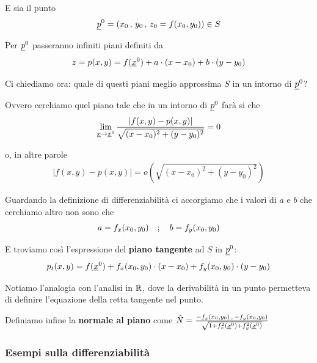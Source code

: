 E sia il punto
\begin{align}
\underline{p}^0 = (x_0 \, , \, y_0 \, , \, z_0=f(x_0,y_0)) \in S
\end{align}

Per $\underline{p}^0$ passeranno infiniti piani definiti da
\begin{align}
z=p(x,y)= f(\underline{x}^0) + a \cdot (x-x_0) + b \cdot (y-y_0)
\end{align}

Ci chiediamo ora: quale di questi piani meglio approssima $S$ in un intorno di $\underline{p}^0$? 

\smallskip

Ovvero cerchiamo quel piano tale che in un intorno di $\underline{p}^0$ farà si che
\begin{align}
\underset{\underline{x} \rightarrow \underline{x}^0}{\lim} \, \frac{|f(x,y) - p(x,y)|}{\sqrt{(x-x_0)^2 + (y-y_0)^2}}=0
\end{align}

o, in altre parole
\begin{align}
|f(x,y) - p(x,y)|= o(\sqrt{(x-x_0)^2 + (y-y_0)^2})
\end{align}

Guardando la definizione di differenziabilità ci accorgiamo che i valori di $a$ e $b$ che cerchiamo altro non sono che
\begin{align}
a= f_x(x_0,y_0) \quad ; \quad b=f_y(x_0,y_0)
\end{align}

E troviamo così l'espressione del \textbf{piano tangente} ad $S$ in $\underline{p}^0$: 
\begin{align}
p_t(x,y)= f(\underline{x}^0) + f_x(x_0,y_0) \cdot (x-x_0) + f_y(x_0,y_0) \cdot (y-y_0)
\end{align}

Notiamo l'analogia con l'analisi in $\mathbb{R}$, dove la derivabilità in un punto permetteva di definire l'equazione della retta tangente nel punto.

Definiamo infine la \textbf{normale al piano} come $\hat{N}=\frac{-f_x(x_0,y_0) \, , \, -f_y(x_0,y_0)}{\sqrt{1+ f_x^2(\underline{x}^0) + f_y^2(\underline{x}^0)} }$

\subsubsection{Esempi sulla differenziabilità}

